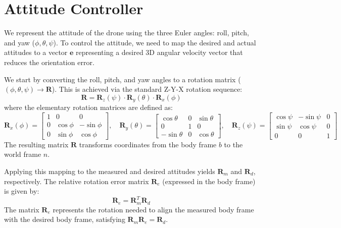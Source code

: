 \documentclass{article}
\begin{document}
	\section{Attitude Controller}
	
	We represent the attitude of the drone using the three Euler angles: roll, pitch, and yaw ($\phi, \theta, \psi$).
	To control the attitude, we need to map the desired and actual attitudes to a vector $\bm{e}$ representing a desired 3D angular velocity vector that reduces the orientation error.
	
	We start by converting the roll, pitch, and yaw angles to a rotation matrix ($\left(\phi, \theta, \psi\right) \rightarrow \mathbf{R}$). This is achieved via the standard Z-Y-X rotation sequence:
	\begin{equation*}
		\mathbf{R} = \mathbf{R}_z(\psi) \cdot \mathbf{R}_y(\theta) \cdot \mathbf{R}_x(\phi)
	\end{equation*}
	where the elementary rotation matrices are defined as:
	\begin{equation*}
		\mathbf{R}_x(\phi) = \begin{bmatrix}
			1 & 0 & 0 \\
			0 & \cos\phi & -\sin\phi \\
			0 & \sin\phi & \cos\phi
		\end{bmatrix}, \quad
		\mathbf{R}_y(\theta) = \begin{bmatrix}
			\cos\theta & 0 & \sin\theta \\
			0 & 1 & 0 \\
			-\sin\theta & 0 & \cos\theta
		\end{bmatrix}, \quad
		\mathbf{R}_z(\psi) = \begin{bmatrix}
			\cos\psi & -\sin\psi & 0 \\
			\sin\psi & \cos\psi & 0 \\
			0 & 0 & 1
		\end{bmatrix}
	\end{equation*}
	The resulting matrix $\mathbf{R}$ transforms coordinates from the body frame $b$ to the world frame $n$.
	
	Applying this mapping to the measured and desired attitudes yields $\mathbf{R}_m$ and $\mathbf{R}_d$, respectively. The relative rotation error matrix $\mathbf{R}_e$ (expressed in the body frame) is given by:
	\begin{equation*}
		\mathbf{R}_e = \mathbf{R}_m^T \mathbf{R}_d
	\end{equation*}
	The matrix $\mathbf{R}_e$ represents the rotation needed to align the measured body frame with the desired body frame, satisfying $\mathbf{R}_m \mathbf{R}_e = \mathbf{R}_d$.
	
\end{document}
